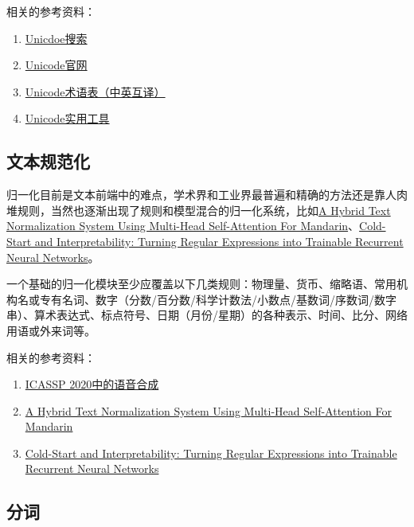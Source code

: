\documentclass[cn,10pt,math=newtx,citestyle=gb7714-2015,bibstyle=gb7714-2015]{elegantbook}
\begin{document}
相关的参考资料：

\begin{enumerate}
  \item \href{https://unicode-table.com/cn}{Unicdoe搜索}
  \item \href{https://unicode.org/main.html}{Unicode官网}
  \item \href{https://www.unicode.org/terminology/term_zh_Hans_CN_en.html}{Unicode术语表（中英互译）}
  \item \href{https://www.unicode.org/unibook}{Unicode实用工具}
\end{enumerate}

\subsection{文本规范化}

归一化目前是文本前端中的难点，学术界和工业界最普遍和精确的方法还是靠人肉堆规则，当然也逐渐出现了规则和模型混合的归一化系统，比如\href{https://arxiv.org/abs/1911.04128}{A Hybrid Text Normalization System Using Multi-Head Self-Attention For Mandarin}、\href{https://aclanthology.org/2020.emnlp-main.258/}{Cold-Start and Interpretability: Turning Regular Expressions into Trainable Recurrent Neural Networks}。

一个基础的归一化模块至少应覆盖以下几类规则：物理量、货币、缩略语、常用机构名或专有名词、数字（分数/百分数/科学计数法/小数点/基数词/序数词/数字串）、算术表达式、标点符号、日期（月份/星期）的各种表示、时间、比分、网络用语或外来词等。

相关的参考资料：

\begin{enumerate}
  \item \href{https://www.cnblogs.com/mengnan/p/13200062.html}{ICASSP 2020中的语音合成}
  \item \href{https://arxiv.org/abs/1911.04128}{A Hybrid Text Normalization System Using Multi-Head Self-Attention For Mandarin}
  \item \href{https://aclanthology.org/2020.emnlp-main.258/}{Cold-Start and Interpretability: Turning Regular Expressions into Trainable Recurrent Neural Networks}
\end{enumerate}

\subsection{分词}
\end{document}
